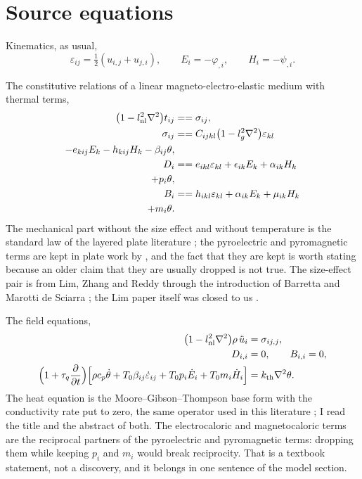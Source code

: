 \documentclass[11pt]{article}
\begin{document}
\section{Source equations}\label{sec:source}

Kinematics, as usual,
\begin{equation}
\varepsilon_{ij}=\tfrac12(u_{i,j}+u_{j,i}),\qquad E_i=-\varphi_{,i},\qquad H_i=-\psi_{,i}.
\end{equation}

The constitutive relations of a linear magneto-electro-elastic medium with thermal terms,
\begin{align}
\bigl(1-l_{\rm nl}^2\nabla^2\bigr)t_{ij}&==\sigma_{ij}, \\
\sigma_{ij}&==C_{ijkl}\bigl(1-l_g^2\nabla^2\bigr)\varepsilon_{kl} \\
-e_{kij}E_k-h_{kij}H_k-\beta_{ij}\theta,\label{eq:C1} \\
D_i&==e_{ikl}\varepsilon_{kl}+\epsilon_{ik}E_k+\alpha_{ik}H_k \\
\quad +p_i\theta,\label{eq:C2} \\
B_i&==h_{ikl}\varepsilon_{kl}+\alpha_{ik}E_k+\mu_{ik}H_k \\
\quad +m_i\theta .\label{eq:C3}
\end{align}
The mechanical part without the size effect and without temperature is the standard law of the layered
plate literature \cite{Chen2007}; the pyroelectric and pyromagnetic terms are kept in plate work by
\cite{Kondaiah2013,Tocci2021}, and the fact that they are kept is worth stating because an older claim
that they are usually dropped is not true. The size-effect pair is from Lim, Zhang and Reddy through the
introduction of Barretta and Marotti de Sciarra \cite[Eqs.~(18)--(19)]{Barretta2018}; the Lim paper itself
was closed to us \cite{Lim2015}.

The field equations,
\begin{align}
\bigl(1-l_{\rm nl}^2\nabla^2\bigr)\rho\,\ddot u_i&=\sigma_{ij,j},\label{eq:mom}\\
D_{i,i}&=0,\qquad B_{i,i}=0,\label{eq:gauss}\\
\Bigl(1+\tau_q\frac{\partial}{\partial t}\Bigr)
\Bigl[\rho c_p\dot\theta+T_0\beta_{ij}\dot\varepsilon_{ij}
+T_0p_i\dot E_i+T_0m_i\dot H_i\Bigr]&=k_{\rm th}\nabla^2\theta .\label{eq:heat}
\end{align}
The heat equation is the Moore--Gibson--Thompson base form with the conductivity rate put to zero, the same
operator used in this literature \cite{Matlam2026,Gupta2025}; I read the title and the abstract of both.
The electrocaloric and magnetocaloric terms are the reciprocal partners of the pyroelectric and
pyromagnetic terms: dropping them while keeping $p_i$ and $m_i$ would break reciprocity. That is a
textbook statement, not a discovery, and it belongs in one sentence of the model section.
\end{document}
